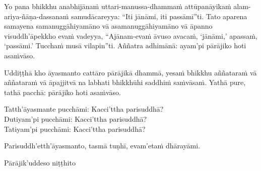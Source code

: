 Yo pana bhikkhu anabhijānaṁ uttari-manussa-dhammaṁ attūpanāyikaṁ alam-ariya-ñāṇa-dassanaṁ samudācareyya: “Iti jānāmi, iti passāmī”ti. Tato aparena samayena samanuggāhiyamāno vā asamanuggāhiyamāno vā āpanno visuddh'āpekkho evaṁ vadeyya, “Ajānam-evaṁ āvuso avacaṁ, ‘jānāmi,' apassaṁ, ‘passāmi.' Tucchaṁ musā vilapin”ti. Aññatra adhimānā: ayam'pi pārājiko hoti asaṁvāso.

\medskip

\begin{center}
Uddiṭṭhā kho āyasmanto cattāro pārājikā dhammā, yesaṁ bhikkhu aññataraṁ vā aññataraṁ vā āpajjitvā na labhati bhikkhūhi saddhiṁ saṁvāsaṁ. Yathā pure, tathā pacchā: pārājiko hoti asaṁvāso.

\smallskip

Tatth'āyasmante pucchāmi: Kacci'ttha parisuddhā?\\
Dutiyam'pi pucchāmi: Kacci'ttha parisuddhā?\\
Tatiyam'pi pucchāmi: Kacci'ttha parisuddhā?

\smallskip

Parisuddh'etth'āyasmanto, tasmā tuṇhī, evam'etaṁ dhārayāmi.
\end{center}

\begin{outro}
  Pārājik'uddeso niṭṭhito
\end{outro}

\clearpage
